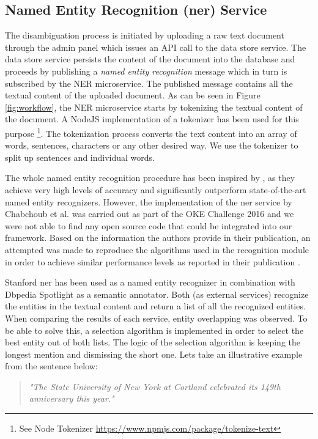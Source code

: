 \subsection{Named Entity Recognition (\ac{ner}) Service}
\label{framework:architecture_NER}
The disambiguation process is initiated by uploading a raw text document through the admin panel which issues an API call to the data store service. The data store service persists the content of the document into the database and proceeds by publishing a \textit{named entity recognition} message which in turn is subscribed by the NER microservice. The published message contains all the textual content of the uploaded document. As can be seen in Figure \ref{fig:workflow}, the NER microservice starts by tokenizing the textual content of the document. A NodeJS implementation of a tokenizer has been used for this purpose \footnote{See Node Tokenizer \url{https://www.npmjs.com/package/tokenize-text}}. The tokenization process converts the text content into an array of words, sentences, characters or any other desired way. We use the tokenizer to split up sentences and individual words. 

The whole named entity recognition procedure has been inspired by \cite{39}, as they achieve very high levels of accuracy and significantly outperform state-of-the-art named entity recognizers. However, the implementation of the \ac{ner} service by Chabchoub et al. \cite{39} was carried out as part of the OKE Challenge 2016 and we were not able to find any open source code that could be integrated into our framework. Based on the information the authors provide in their publication, an attempted was made to reproduce the algorithms used in the recognition module in order to achieve similar performance levels as reported in their publication \cite{39}.

Stanford \ac{ner} \cite{standfordNER} has been used as a named entity recognizer in combination with Dbpedia Spotlight \cite{dbpedia} as a semantic annotator. Both (as external services) recognize the entities in the textual content and return a list of all the recognized entities. When comparing the results of each service, entity overlapping was observed. To be able to solve this, a selection algorithm is implemented in order to select the best entity out of both lists. The logic of the selection algorithm is keeping the longest mention and dismissing the short one. Lets take an illustrative example from the sentence below: 

\begin{quote}
\textit{"The State University of New York at Cortland celebrated its 149th anniversary this year."}
\end{quote}

